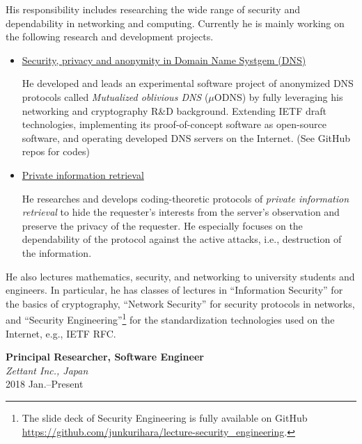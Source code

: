 \hspace*{4ex} His responsibility includes researching the wide range of security and dependability in networking and computing.
Currently he is mainly working on the following research and development projects.
\begin{itemize}
\item \hspace*{4ex} \underline{Security, privacy and anonymity in Domain Name Systgem (DNS)}\\[0.5ex]
\hspace*{6ex}\begin{minipage}{0.9\linewidth}
He developed and leads an experimental software project of anonymized DNS protocols called \textit{Mutualized oblivious DNS} ($\mu$ODNS) by fully leveraging his networking and cryptography R\&D background. Extending IETF draft technologies, implementing its proof-of-concept software as open-source software, and operating developed DNS servers on the Internet. (See GitHub repos for codes)
\end{minipage}
\item \hspace*{4ex} \underline{Private information retrieval}\\[0.5ex]
\hspace*{6ex}\begin{minipage}{0.9\linewidth}
He researches and develops coding-theoretic protocols of \emph{private information retrieval} to hide the requester's interests from the server's observation and preserve the privacy of the requester. He especially focuses on the dependability of the protocol against the active attacks, i.e., destruction of the information.
\end{minipage}
\end{itemize}
He also lectures mathematics, security, and networking to university students and engineers.
In particular, he has classes of lectures in ``Information Security'' for the basics of cryptography, ``Network Security'' for security protocols in networks, and ``Security Engineering''\footnote{The slide deck of Security Engineering is fully available on GitHub \url{https://github.com/junkurihara/lecture-security_engineering}.} for the standardization technologies used on the Internet, e.g., IETF RFC.
\vspace*{2ex}

\textbf{Principal Researcher, Software Engineer}\\
\hspace*{4ex}\textit{Zettant Inc., Japan}\\
\hspace*{4ex}2018 Jan.--Present

